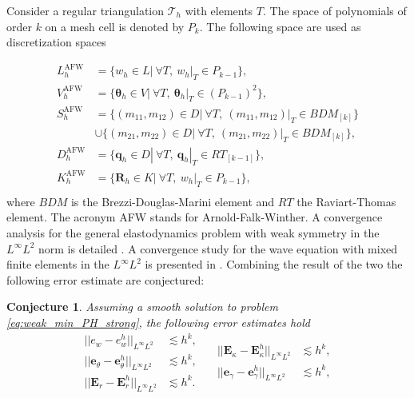\documentclass{ifacconf}
\newtheorem{conjecture}{Conjecture}
\begin{document}
Consider a regular triangulation $\mathcal{T}_h$ with elements $T$. The space of polynomials of order $k$ on a mesh cell is denoted by $P_k$. The following space are used as discretization spaces

\begin{equation}
\label{eq:AFW}
\begin{aligned}
L_h^{\text{AFW}} &= \{w_h \in L | \ \forall T, \ w_h|_{T} \in P_{k-1} \}, \\
V_h^{\text{AFW}} &= \{\bm{\theta}_h \in V | \ \forall T,\ \bm{\theta}_h|_{T} \in (P_{k-1})^2 \}, \\
S_h^{\text{AFW}} &= \{(m_{11}, m_{12}) \in D| \ \forall T,\ (m_{11}, m_{12})|_{T} \in BDM_{[k]} \}  \\
& \cup \{(m_{21}, m_{22}) \in D| \ \forall T,\ (m_{21}, m_{22})|_{T} \in BDM_{[k]} \}, \\
D_h^{\text{AFW}} &= \{\bm{q}_h \in D | \ \forall T,\ \bm{q}_h|_{T} \in RT_{[k-1]} \}, \\
K_h^{\text{AFW}} &= \{\bm{R}_h \in K | \ \forall T, \ w_h|_{T} \in P_{k-1} \}, \\ 
\end{aligned}
\end{equation}
where $BDM$ is the Brezzi-Douglas-Marini element and $RT$ the Raviart-Thomas element. The acronym AFW stands for Arnold-Falk-Winther. A convergence analysis for the general elastodynamics problem with weak symmetry in the $L^\infty L^2$ norm is detailed \cite{ArnoldWeak}. A convergence study for the wave equation with mixed finite elements in the $L^\infty L^2$ is presented in \cite{Geveci}. Combining the result of the two the following error estimate are conjectured:
\begin{conjecture}
	Assuming a smooth solution to problem \eqref{eq:weak_min_PH_strong}, the following error estimates hold 
	\begin{equation}
	\label{eq:errAFW}
	\begin{aligned}
	||e_w - e_w^h||_{L^{\infty} L^2} &\lesssim h^{k}, \\
	||\bm{e}_\theta - \bm{e}_\theta^h||_{L^{\infty} L^2} &\lesssim h^{k}, \\
	||\bm{E}_r - \bm{E}_r^h||_{L^{\infty} L^2} &\lesssim h^{k}. \\
	\end{aligned} \quad
	\begin{aligned}
	||\bm{E}_\kappa - \bm{E}_\kappa^h||_{L^{\infty} L^2} &\lesssim  h^{k}, \\
	||\bm{e}_\gamma - \bm{e}_\gamma^ h||_{L^{\infty} L^2} &\lesssim  h^{k}, \\
	\end{aligned} 
	\end{equation}
\end{conjecture}
\end{document}
